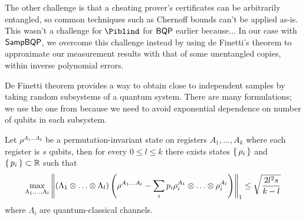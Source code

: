The other challenge is that a cheating prover's certificates can be arbitrarily entangled,
so common techniques such as Chernoff bounds can't be applied as-is.
This wasn't a challenge for $\Piblind$ for $\operatorname{\mathsf{BQP}}$ earlier because...
In our case with $\operatorname{\mathsf{SampBQP}}$, we overcome this challenge instead by using de Finetti's theorem
to approximate our measurement results with that of some unentangled copies,
within inverse polynomial errors.

De Finetti theorem provides a way to obtain close to independent samples by taking random subsystems of a quantum system.
There are many formulations; we use the one from \cite{Brandão2017} because we need to avoid exponential dependence on number of qubits in each subsystem.
\begin{thm}
	\label{deFinetti}
	Let $\rho^{A_1\ldots A_k}$ be a permutation-invariant state on registers $A_1,\ldots,A_k$ where each register is $s$ qubits,
	then for every $0\leq l\leq k$ there exists states $\set{\rho_i}$ and $\set{p_i}\subset\mathbb{R}$ such that
	$$\max_{\Lambda_1,\ldots,\Lambda_l}
	\left\lVert(\Lambda_1\otimes\ldots\otimes\Lambda_l)\left(\rho^{A_1\ldots A_l}-\sum_ip_i\rho_i^{A_1}\otimes\ldots\otimes\rho_i^{A_l}\right)\right\rVert_1
	\leq\sqrt{\frac{2l^2s}{k-l}}$$
	where $\Lambda_i$ are quantum-classical channels.
\end{thm}







